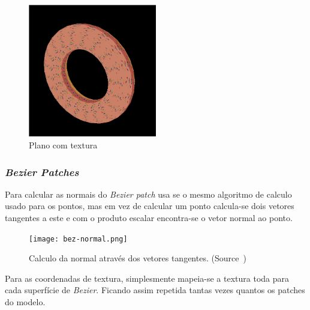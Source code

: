 \documentclass[a4paper]{article}
\begin{document}
\begin{figure}[H]
    \centering
    \includegraphics[width=0.5\textwidth]{torus.png}
    \caption{Plano com textura}
\end{figure}

\subsubsection{\textit{Bezier Patches}}

Para calcular as normais do \textit{Bezier patch} usa se o mesmo algoritmo de
calculo usado para os pontos, mas em vez de calcular um ponto calcula-se dois
vetores tangentes a este e com o produto escalar encontra-se o vetor normal ao
ponto.

\begin{figure}[H]
    \centering
    \texttt{[image: bez-normal.png]}
    \caption{Calculo da normal através dos vetores tangentes.
    (Source~\cite{Bezier})}
\end{figure}

Para as coordenadas de textura, simplesmente mapeia-se a textura toda para cada
superfície de \textit{Bezier}. Ficando assim repetida tantas vezes quantos os
patches do modelo.
\end{document}

